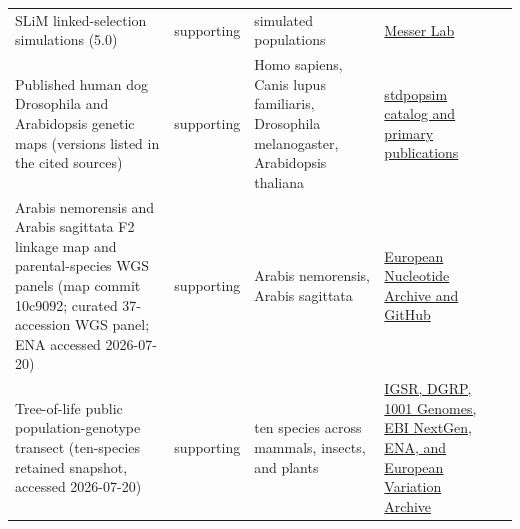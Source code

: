 \begin{longtable}{@{}p{}p{}p{}p{}p{}@{}}
SLiM linked-selection simulations (5.0) & supporting & simulated populations & \href{https://messerlab.org/slim/}{Messer Lab} & \citep{haller2026slim5} \\
Published human dog Drosophila and Arabidopsis genetic maps (versions listed in the cited sources) & supporting & Homo sapiens, Canis lupus familiaris, Drosophila melanogaster, Arabidopsis thaliana & \href{https://popsim-consortium.github.io/stdpopsim-docs/stable/catalog.html}{stdpopsim catalog and primary publications} & \citep{halldorsson2019decode,hapmap2007,campbell2016dog,comeron2012drosophila,salome2012arabidopsis} \\
Arabis nemorensis and Arabis sagittata F2 linkage map and parental-species WGS panels (map commit 10c9092; curated 37-accession WGS panel; ENA accessed 2026-07-20) & supporting & Arabis nemorensis, Arabis sagittata & \href{https://www.ebi.ac.uk/ena/browser/view/PRJEB89863}{European Nucleotide Archive and GitHub} & \citep{rahnamae2026arabis,dittberner2022arabis} \\
Tree-of-life public population-genotype transect (ten-species retained snapshot, accessed 2026-07-20) & supporting & ten species across mammals, insects, and plants & \href{https://www.ebi.ac.uk/eva/}{IGSR, DGRP, 1001 Genomes, EBI NextGen, ENA, and European Variation Archive} & \citep{1000genomes2015,nextgen_project,todd2022donkey,mackay2012dgrp,huang2014dgrp,pannebakker2020nasonia,genomes1001_2016,wang2018aspen,robinson2024aspen,chestnut_prjeb87510,cezard2022eva} \\
\bottomrule
\end{longtable}
